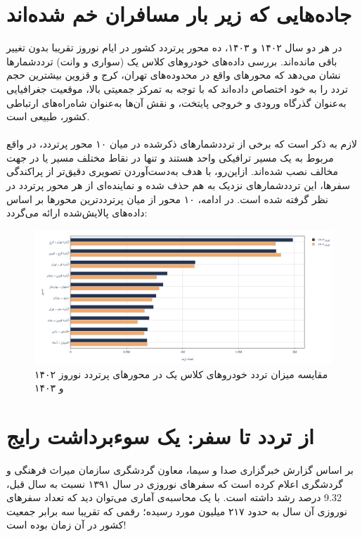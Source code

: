 \documentclass[a4paper, 12pt]{article}
\begin{document}
\section{جاده‌هایی که زیر بار مسافران خم شده‌اند}
در هر دو سال ۱۴۰۲ و ۱۴۰۳، ده محور پرتردد کشور در ایام نوروز تقریبا بدون تغییر باقی مانده‌اند. بررسی داده‌های خودروهای کلاس یک (سواری و وانت) ترددشمارها نشان می‌دهد که محورهای واقع در محدوده‌های تهران، کرج و قزوین بیشترین حجم تردد را به خود اختصاص داده‌اند که با توجه به تمرکز جمعیتی بالا، موقعیت جغرافیایی به‌عنوان گذرگاه ورودی و خروجی پایتخت، و نقش آن‌ها به‌عنوان شاه‌راه‌های ارتباطی کشور، طبیعی است.
\\
\\
لازم به ذکر است که برخی از ترددشمارهای ذکرشده در میان ۱۰ محور پرتردد، در واقع مربوط به یک مسیر ترافیکی واحد هستند و تنها در نقاط مختلف مسیر یا در جهت مخالف نصب شده‌اند. ازاین‌رو، با هدف به‌دست‌آوردن تصویری دقیق‌تر از پراکندگی سفرها، این ترددشمارهای نزدیک به هم حذف شده و نماینده‌ای از هر محور پرتردد در نظر گرفته شده است. در ادامه، ۱۰ محور از میان پرترددترین محورها بر اساس داده‌های پالایش‌شده ارائه می‌گردد:
\begin{figure}[htbp]
    \centering
    \includegraphics[width=1\textwidth]{most_taradod_roads.png}
    \caption{مقایسه میزان تردد خودروهای کلاس یک در محورهای پرتردد نوروز ۱۴۰۲ و ۱۴۰۳}
\end{figure}

\newpage
\section{از تردد تا سفر: یک سوء‌برداشت رایج}
بر اساس گزارش خبرگزاری صدا و سیما، معاون گردشگری سازمان میراث فرهنگی و گردشگری اعلام کرده است که سفرهای نوروزی در سال ۱۳۹۱ نسبت به سال قبل،
9.32
درصد رشد داشته است. با یک محاسبه‌ی آماری می‌توان دید که تعداد سفرهای نوروزی آن سال به حدود ۲۱۷ میلیون مورد رسیده؛ رقمی که تقریبا سه برابر جمعیت کشور در آن زمان بوده است!
\\
\end{document}
